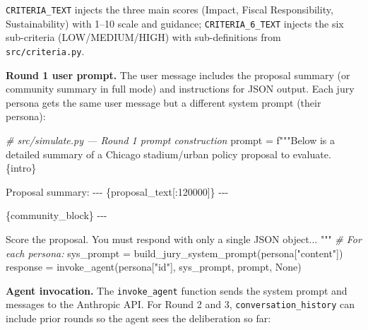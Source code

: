 \documentclass[
  11pt,
]{article}
\newenvironment{Shaded}{}{}
\newcommand{\CommentTok}[1]{\textcolor[rgb]{0.38,0.63,0.69}{\textit{#1}}}
\newcommand{\DecValTok}[1]{\textcolor[rgb]{0.25,0.63,0.44}{#1}}
\newcommand{\NormalTok}[1]{#1}
\newcommand{\OperatorTok}[1]{\textcolor[rgb]{0.40,0.40,0.40}{#1}}
\newcommand{\SpecialCharTok}[1]{\textcolor[rgb]{0.25,0.44,0.63}{#1}}
\newcommand{\SpecialStringTok}[1]{\textcolor[rgb]{0.73,0.40,0.53}{#1}}
\newcommand{\StringTok}[1]{\textcolor[rgb]{0.25,0.44,0.63}{#1}}
\newcommand{\VariableTok}[1]{\textcolor[rgb]{0.10,0.09,0.49}{#1}}
\begin{document}
\texttt{CRITERIA\_TEXT} injects the three main scores (Impact, Fiscal
Responsibility, Sustainability) with 1--10 scale and guidance;
\texttt{CRITERIA\_6\_TEXT} injects the six sub-criteria
(LOW/MEDIUM/HIGH) with sub-definitions from \texttt{src/criteria.py}.

\textbf{Round 1 user prompt.} The user message includes the proposal
summary (or community summary in full mode) and instructions for JSON
output. Each jury persona gets the same user message but a different
system prompt (their persona):

\begin{Shaded}
\begin{Highlighting}[]
\CommentTok{\# src/simulate.py — Round 1 prompt construction}
\NormalTok{prompt }\OperatorTok{=} \SpecialStringTok{f"""Below is a detailed summary of a Chicago stadium/urban policy proposal to evaluate. }\SpecialCharTok{\{}\NormalTok{intro}\SpecialCharTok{\}}

\SpecialStringTok{Proposal summary:}
\SpecialStringTok{{-}{-}{-}}
\SpecialCharTok{\{}\NormalTok{proposal\_text[:}\DecValTok{120000}\NormalTok{]}\SpecialCharTok{\}}
\SpecialStringTok{{-}{-}{-}}

\SpecialCharTok{\{}\NormalTok{community\_block}\SpecialCharTok{\}}
\SpecialStringTok{{-}{-}{-}}

\SpecialStringTok{Score the proposal. You must respond with only a single JSON object...}
\SpecialStringTok{"""}
\CommentTok{\# For each persona:}
\NormalTok{sys\_prompt }\OperatorTok{=}\NormalTok{ build\_jury\_system\_prompt(persona[}\StringTok{"content"}\NormalTok{])}
\NormalTok{response }\OperatorTok{=}\NormalTok{ invoke\_agent(persona[}\StringTok{"id"}\NormalTok{], sys\_prompt, prompt, }\VariableTok{None}\NormalTok{)}
\end{Highlighting}
\end{Shaded}

\textbf{Agent invocation.} The \texttt{invoke\_agent} function sends the
system prompt and messages to the Anthropic API. For Round 2 and 3,
\texttt{conversation\_history} can include prior rounds so the agent
sees the deliberation so far:
\end{document}
